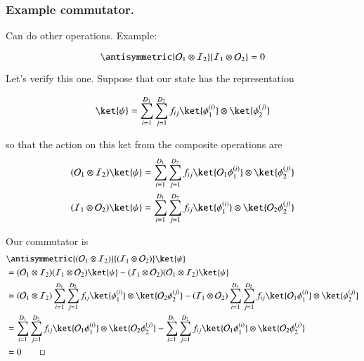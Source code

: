 \subsubsection{Example commutator.}

Can do other operations.  Example:

\begin{equation}\label{eqn:qmTwoL1:310}
\antisymmetric{ \mathcal{O}_1 \otimes \mathcal{I}_2 }{ \mathcal{I}_1 \otimes \mathcal{O}_2 } = 0
\end{equation}

Let's verify this one.  Suppose that our state has the representation

\begin{equation}\label{eqn:qmTwoL1:330}
\ket{\psi} 
= 
\sum_{i = 1}^{D_1}
\sum_{j = 1}^{D_2}
f_{ij}
\ket{ \phi_1^{(i)}} \otimes \ket{ \phi_2^{(j)}}
\end{equation}

so that the action on this ket from the composite operations are
\begin{align}\label{eqn:qmTwoL1:350}
(\mathcal{O}_1 \otimes \mathcal{I}_2)
\ket{\psi} 
&= 
\sum_{i = 1}^{D_1}
\sum_{j = 1}^{D_2}
f_{ij}
\ket{ \mathcal{O}_1 \phi_1^{(i)}} \otimes \ket{ \phi_2^{(j)}} \\
(\mathcal{I}_1 \otimes \mathcal{O}_2)
\ket{\psi} 
&= 
\sum_{i = 1}^{D_1}
\sum_{j = 1}^{D_2}
f_{ij}
\ket{ \phi_1^{(i)}} \otimes \ket{ \mathcal{O}_2 \phi_2^{(j)}}
\end{align}

Our commutator is
\begin{align*}
&\antisymmetric{(\mathcal{O}_1 \otimes \mathcal{I}_2)}{(\mathcal{I}_1 \otimes \mathcal{O}_2)}
\ket{\psi} \\
&=
(\mathcal{O}_1 \otimes \mathcal{I}_2)(\mathcal{I}_1 \otimes \mathcal{O}_2) 
\ket{\psi} 
-(\mathcal{I}_1 \otimes \mathcal{O}_2)(\mathcal{O}_1 \otimes \mathcal{I}_2)
\ket{\psi}  \\
&=
(\mathcal{O}_1 \otimes \mathcal{I}_2)
\sum_{i = 1}^{D_1}
\sum_{j = 1}^{D_2}
f_{ij}
\ket{ \phi_1^{(i)}} \otimes \ket{ \mathcal{O}_2 \phi_2^{(j)}}
-(\mathcal{I}_1 \otimes \mathcal{O}_2)
\sum_{i = 1}^{D_1}
\sum_{j = 1}^{D_2}
f_{ij}
\ket{ \mathcal{O}_1 \phi_1^{(i)}} \otimes \ket{ \phi_2^{(j)}} \\
&=
\sum_{i = 1}^{D_1}
\sum_{j = 1}^{D_2}
f_{ij}
\ket{ \mathcal{O}_1 \phi_1^{(i)}} \otimes \ket{ \mathcal{O}_2 \phi_2^{(j)}}
-
\sum_{i = 1}^{D_1}
\sum_{j = 1}^{D_2}
f_{ij}
\ket{ \mathcal{O}_1 \phi_1^{(i)}} \otimes \ket{ \mathcal{O}_2 \phi_2^{(j)}} \\
&=
0 \qquad \square
\end{align*}

